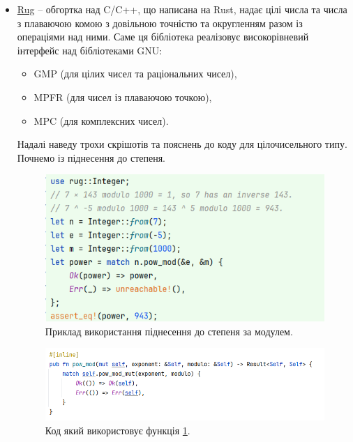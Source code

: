 \begin{itemize}
	\item \href{https://crates.io/crates/rug}{Rug} -- обгортка над C/C++, що написана на Rust, надає цілі числа та числа з плаваючою комою з довільною точністю та округленням разом із операціями над ними. Саме ця бібліотека реалізовує високорівневий інтерфейс над бібліотеками GNU:
	\begin{itemize}
		\item GMP (для цілих чисел та раціональних чисел),
		\item MPFR (для чисел із плаваючою точкою),
		\item MPC (для комплексних чисел).
	\end{itemize}
		
	Надалі наведу трохи скрішотів та пояснень до коду для цілочисельного типу. 
    Почнемо із піднесення до степеня.
	\begin{figure}[!h]
    		\centering
    		\includegraphics[scale = 0.45]{IMAGES/Rust/pow_mod_rug}
    		\caption{Приклад використання піднесення до степеня за модулем.}
    		\label{fig:pow_mod_rug}
	\end{figure}
	
	\begin{figure}[!h]
    		\centering
    		\includegraphics[scale = 0.45]{IMAGES/Rust/pow_mod_rug_code1}
    		\caption{Код який використовує функція \ref{fig:pow_mod_rug}.}
    		\label{fig:pow_mod_rug_code1}
	\end{figure}
	

\end{itemize}
